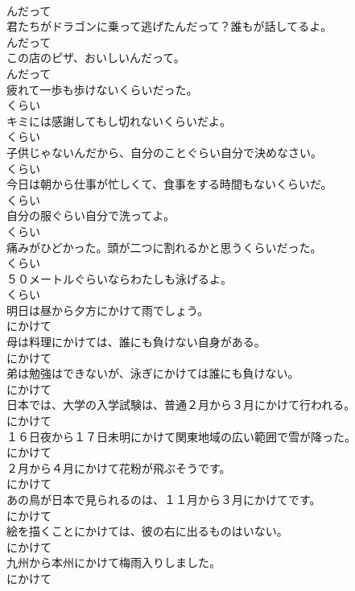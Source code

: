 \documentclass[8pt]{extreport}
\begin{document}
\begin{CJK}{UTF8}{min}
\\	んだって	
\\	君たちがドラゴンに乗って逃げたんだって？誰もが話してるよ。	
\\	んだって	
\\	この店のピザ、おいしいんだって。	
\\	んだって	
\\	疲れて一歩も歩けないくらいだった。	
\\	くらい	
\\	キミには感謝してもし切れないくらいだよ。	
\\	くらい	
\\	子供じゃないんだから、自分のことぐらい自分で決めなさい。	
\\	くらい	
\\	今日は朝から仕事が忙しくて、食事をする時間もないくらいだ。	
\\	くらい	
\\	自分の服ぐらい自分で洗ってよ。	
\\	くらい	
\\	痛みがひどかった。頭が二つに割れるかと思うくらいだった。	
\\	くらい	
\\	５０メートルぐらいならわたしも泳げるよ。	
\\	くらい	
\\	明日は昼から夕方にかけて雨でしょう。	
\\	にかけて	
\\	母は料理にかけては、誰にも負けない自身がある。	
\\	にかけて	
\\	弟は勉強はできないが、泳ぎにかけては誰にも負けない。	
\\	にかけて	
\\	日本では、大学の入学試験は、普通２月から３月にかけて行われる。	
\\	にかけて	
\\	１６日夜から１７日未明にかけて関東地域の広い範囲で雪が降った。	
\\	にかけて	
\\	２月から４月にかけて花粉が飛ぶそうです。	
\\	にかけて	
\\	あの鳥が日本で見られるのは、１１月から３月にかけてです。	
\\	にかけて	
\\	絵を描くことにかけては、彼の右に出るものはいない。	
\\	にかけて	
\\	九州から本州にかけて梅雨入りしました。	
\\	にかけて	

\end{CJK}
\end{document}
